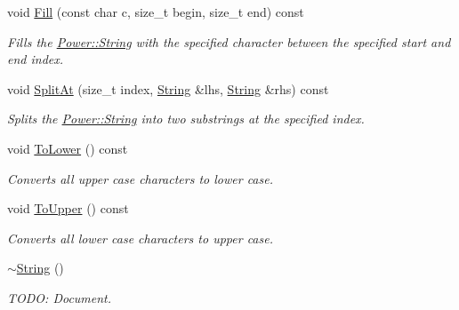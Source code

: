 \begin{DoxyCompactItemize}
void \hyperlink{class_power_1_1_string_ae1e7ac80b210811821a0a62eab36c2ac}{Fill} (const char c, size\+\_\+t begin, size\+\_\+t end) const
\begin{DoxyCompactList}\small\item\em Fills the \hyperlink{class_power_1_1_string}{Power\+::\+String} with the specified character between the specified start and end index. \end{DoxyCompactList}\item 
void \hyperlink{class_power_1_1_string_a7009c79c7fa9b393fdbbc1922b14403a}{Split\+At} (size\+\_\+t index, \hyperlink{class_power_1_1_string}{String} \&lhs, \hyperlink{class_power_1_1_string}{String} \&rhs) const
\begin{DoxyCompactList}\small\item\em Splits the \hyperlink{class_power_1_1_string}{Power\+::\+String} into two substrings at the specified index. \end{DoxyCompactList}\item 
void \hyperlink{class_power_1_1_string_ad1395f09eb54ec62ff077741203c27b5}{To\+Lower} () const
\begin{DoxyCompactList}\small\item\em Converts all upper case characters to lower case. \end{DoxyCompactList}\item 
void \hyperlink{class_power_1_1_string_a9b4fbde0111caf61d777aec6b5becf59}{To\+Upper} () const
\begin{DoxyCompactList}\small\item\em Converts all lower case characters to upper case. \end{DoxyCompactList}\item 
\hyperlink{class_power_1_1_string_af3e98839735047cdb9362232836fd773}{$\sim$\+String} ()
\begin{DoxyCompactList}\small\item\em T\+O\+DO\+: Document. \end{DoxyCompactList}\end{DoxyCompactItemize}
